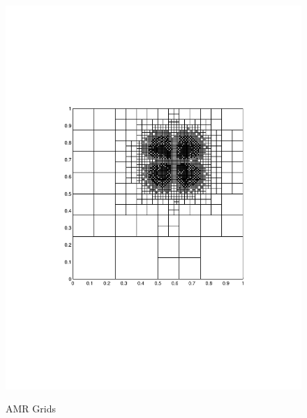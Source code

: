 \documentclass[preprint,10pt]{elsarticle}
\begin{document}
\begin{figure}[!hbtp]
{\includegraphics[scale=0.25]{../pwld_diffusion/results/amr/amr0_8_matlab_mesh_linewidth_1/amr_mms_2_threshold0_8_amr_cy30}
\label{fig:amr_cycle_30}
}
\caption{AMR Grids}
\label{fig:amr_grids}
\end{figure}
\end{document}
